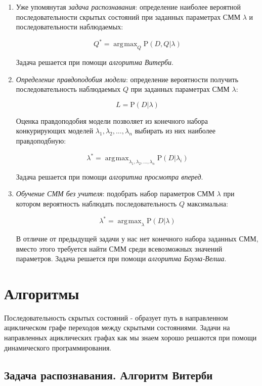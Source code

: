 \documentclass[letterpaper, 11pt]{article}
\newcommand{\prob}{\mathrm{P}}
\DeclareMathOperator*{\argmax}{\arg\!\max}
\begin{document}
\begin{enumerate}

\item Уже упомянутая \textit{задача распознавания}: определение наиболее вероятной последовательности скрытых состояний при заданных параметрах СММ $\lambda$ и последовательности наблюдаемых:

$$Q^*=\argmax_Q \prob(D,Q|\lambda)$$

Задача решается при помощи \textit{алгоритма Витерби}.

\item \textit{Определение правдоподобия модели}: определение вероятности получить последовательность наблюдаемых $Q$ при заданных параметрах СММ $\lambda$:

$$L=\prob(D|\lambda)$$

Оценка правдоподобия модели позволяет из конечного набора конкурирующих моделей $\lambda_1,\lambda_2,\ldots,\lambda_n$ выбирать из них наиболее правдоподбную:

$$\lambda^*=\argmax_{\lambda_1,\lambda_2,\ldots,\lambda_n}\prob(D|\lambda_i)$$

Задача решается при помощи \textit{алгоритма просмотра вперед}.

\item \textit{Обучение СММ без учителя}: подобрать набор параметров СММ $\lambda$ при котором вероятность наблюдать последовательность $Q$ максимальна:

$$\lambda^*=\argmax_{\lambda}\prob(D|\lambda)$$

В отличие от предыдущей задачи у нас нет конечного набора заданных СММ, вместо этого требуется найти СММ среди всевозможных значений параметров. Задача решается при помощи \textit{алгоритма Баума-Велша}.


\end{enumerate}

\section{Алгоритмы}

Последовательность скрытых состояний - образует путь в направленном ациклическом графе переходов между скрытыми состояниями. Задачи на направленных ациклических графах как мы знаем хорошо решаются при помощи динамического программирования.

\subsection{Задача распознавания. Алгоритм Витерби}
\end{document}

